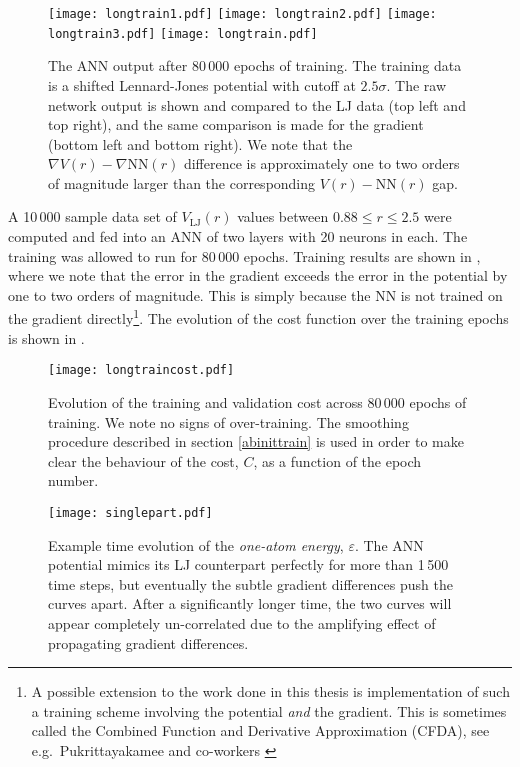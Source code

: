 \documentclass[../../master.tex]{subfiles}
\begin{document}
\begin{figure}
\centering
\texttt{[image: longtrain1.pdf]}
\texttt{[image: longtrain2.pdf]}
\texttt{[image: longtrain3.pdf]}
\texttt{[image: longtrain.pdf]}
\caption{The ANN output after 80\,000 epochs of training. The training data is a shifted Lennard-Jones potential with cutoff at $2.5\sigma$. The raw network output is shown and compared to the LJ data (top left and top right), and the same comparison is made for the gradient (bottom left and bottom right). We note that the $\nabla V(r)-\nabla \text{NN}(r)$ difference is approximately one to two orders of magnitude larger than the corresponding $V(r)-\text{NN}(r)$ gap.  \label{fig:longtrain}}
\end{figure}

A 10\,000 sample data set of $V_\text{LJ}(r)$ values between $0.88\le r \le 2.5$ were computed and fed into an ANN of two layers with 20 neurons in each. The training was allowed to run for 80\,000 epochs. Training results are shown in , where we note that the error in the gradient exceeds the error in the potential by one to two orders of magnitude. This is simply because the NN is not trained on the gradient directly\footnote{A possible extension to the work done in this thesis is implementation of such a training scheme involving the potential \emph{and} the gradient. This is sometimes called the Combined Function and Derivative Approximation (CFDA), see e.g.\ Pukrittayakamee and co-workers \cite{pukrittayakamee2009simultaneous}}. The evolution of the cost function over the training epochs is shown in . 

\begin{SCfigure}
\centering
\texttt{[image: longtraincost.pdf]}
\caption{Evolution of the training and validation cost across 80\,000 epochs of training. We note no signs of over-training. The smoothing procedure described in section \ref{abinittrain} is used in order to make clear the behaviour of the cost, $C$, as a function of the epoch number. \label{fig:longtrainmeta}}
\end{SCfigure}
\begin{figure}
\centering
\texttt{[image: singlepart.pdf]}
\caption{Example time evolution of the \emph{one-atom energy}, $\varepsilon$. The ANN potential mimics its LJ counterpart perfectly for more than 1\,500 time steps, but eventually the subtle gradient differences push the curves apart. After a significantly longer time, the two curves will appear completely un-correlated due to the amplifying effect of propagating gradient differences.  \label{fig:singlepart}}
\end{figure}
\end{document}
